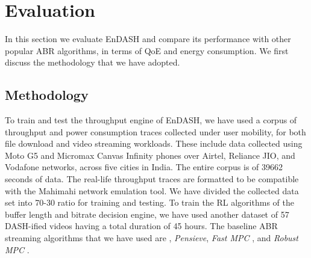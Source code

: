 \section{Evaluation}\label{sec:chap04:evaluation}

In this section we evaluate EnDASH and compare its performance with other popular \ac{ABR} algorithms, in terms of \ac{QoE} and energy consumption. We first discuss the methodology that we have adopted.
\subsection{Methodology}
To train and test the throughput engine of EnDASH, we have used a corpus of throughput and power consumption traces collected under user mobility, for both file download and video streaming workloads. These include data collected using Moto G5 and Micromax Canvas Infinity phones over Airtel, Reliance JIO, and Vodafone networks, across five cities in India. The entire corpus is of 39662 seconds of data. The real-life throughput traces are formatted to be compatible with the Mahimahi \cite{mahimahi} network emulation tool. We have divided the collected data set into 70-30 ratio for training and testing. To train the RL algorithms of the buffer length and bitrate decision engine, we have used another  dataset of 57 DASH-ified videos having a total duration of 45 hours.
The baseline \ac{ABR} streaming algorithms that we have used are  \cite{Spiteri2016}, \textit{Pensieve}\cite{mao2017neural}, \textit{Fast MPC} \cite{yin2015control}, and \textit{Robust MPC} \cite{yin2015control}.

